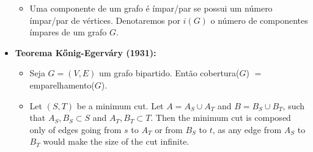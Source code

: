 \begin{itemize}
\begin{itemize}
            \item Uma componente de um grafo é ímpar/par se possui um número ímpar/par de vértices. Denotaremos por $i(G)$ o número de componentes ímpares de um grafo $G$.
        \end{itemize}
        \item \textbf{Teorema Kőnig-Egerváry (1931):}
        \begin{itemize}
            \item Seja $G=(V, E)$ um grafo bipartido. Então cobertura($G$) $=$ emparelhamento($G$).
            \item Let 
$\displaystyle (S,T)$ be a minimum cut. Let 
$\displaystyle A=A_{S}\cup A_{T}$ and 
$\displaystyle B=B_{S}\cup B_{T}$, such that 
$\displaystyle A_{S},B_{S}\subset S$ and 
$\displaystyle A_{T},B_{T}\subset T$. Then the minimum cut is composed only of edges going from
$\displaystyle s$ to 
$\displaystyle A_{T}$ or from 
$\displaystyle B_{S}$ to 
$\displaystyle t$, as any edge from 
$\displaystyle A_{S}$ to 
$\displaystyle B_{T}$ would make the size of the cut infinite.


\end{itemize}
\end{itemize}
